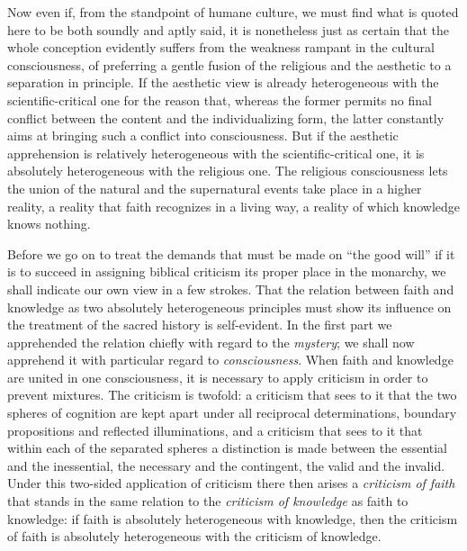 \documentclass[12pt]{book}
\newcommand{\opage}[1]{\marginnote{\footnotesize\textit{[#1]}}}
\begin{document}
Now even if, from the standpoint of humane culture, we must find what is quoted here to be both soundly and aptly said, it is nonetheless just as certain that the whole conception evidently suffers from the weakness rampant in the cultural consciousness, of preferring a gentle fusion of the religious and the aesthetic to a separation in principle. If the aesthetic view is already heterogeneous with the
\opage{58}\setcounter{footnote}{0}%
scientific-critical one for the reason that, whereas the former permits no final conflict between the content and the individualizing form, the latter constantly aims at bringing such a conflict into consciousness. But if the aesthetic apprehension is relatively heterogeneous with the scientific-critical one, it is absolutely heterogeneous with the religious one. The religious consciousness lets the union of the natural and the supernatural events take place in a higher reality, a reality that faith recognizes in a living way, a reality of which knowledge knows nothing.

Before we go on to treat the demands that must be made on ``the good will'' if it is to succeed in assigning biblical criticism its proper place in the monarchy, we shall indicate our own view in a few strokes. That the relation between faith and knowledge as two absolutely heterogeneous principles must show its influence on the treatment of the sacred history is self-evident. In the first part we apprehended the relation chiefly with regard to the \emph{mystery}; we shall now apprehend it with particular regard to \emph{consciousness}. When faith and knowledge are united in one consciousness, it is necessary to apply criticism in order to prevent mixtures. The criticism is twofold: a criticism that sees to it that the two spheres of cognition are kept apart under all reciprocal determinations, boundary propositions and reflected illuminations, and a criticism that sees to it that within each of the separated spheres a distinction is made between the essential and the inessential, the necessary and the contingent, the valid and the invalid. Under this two-sided application of criticism there then arises a \emph{criticism of faith} that stands in the same relation to the \emph{criticism of knowledge} as faith to knowledge: if faith is absolutely heterogeneous with knowledge, then the criticism of faith is absolutely heterogeneous with the criticism of knowledge.
\end{document}
